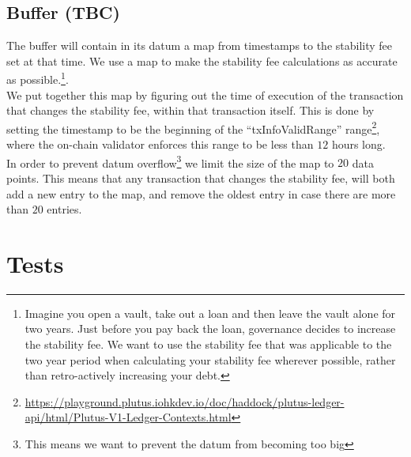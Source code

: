 \documentclass{article} %
\begin{document}
\subsection{Buffer (TBC)}

The buffer will contain in its datum a map from timestamps to the stability fee
set at that time.
We use a map to make the stability fee calculations as accurate as
possible.\footnote{
  Imagine you open a vault, take out a loan and then leave the vault alone for
  two years.
  Just before you pay back the loan, governance decides to increase the
  stability fee.
  We want to use the stability fee that was applicable to the two year period
  when calculating your stability fee wherever possible, rather than
  retro-actively increasing your debt.
}. \\

We put together this map by figuring out the time of execution of the
transaction that changes the stability fee, within that transaction itself.
This is done by setting the timestamp to be the beginning of the
``txInfoValidRange'' range\footnote{
  \url{https://playground.plutus.iohkdev.io/doc/haddock/plutus-ledger-api/html/Plutus-V1-Ledger-Contexts.html}},
where the on-chain validator enforces this range to be less than $12$ hours
long. \\

In order to prevent datum overflow\footnote{
  This means we want to prevent the datum from becoming too big}
we limit the size of the map to $20$ data points.
This means that any transaction that changes the stability fee, will both add a
new entry to the map, and remove the oldest entry in case there are more than
$20$ entries.

\section{Tests}


% 
\end{document}
